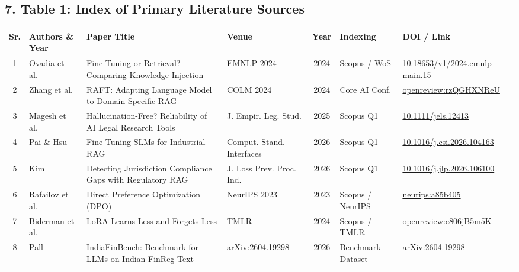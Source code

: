 \documentclass[11pt,a4paper]{article}
\begin{document}
\subsection*{7. Table 1: Index of Primary Literature Sources}

\begin{table}[h!]
\centering
\scriptsize
\begin{tabularx}{\textwidth}{|c|l|X|l|c|l|l|}
\hline
\rowcolor{tablehead} \textbf{Sr.} & \textbf{Authors \& Year} & \textbf{Paper Title} & \textbf{Venue} & \textbf{Year} & \textbf{Indexing} & \textbf{DOI / Link} \\ \hline
1 & Ovadia et al.~\cite{ovadia2024knowledge} & Fine-Tuning or Retrieval? Comparing Knowledge Injection & EMNLP 2024 & 2024 & Scopus / WoS & \href{https://doi.org/10.18653/v1/2024.emnlp-main.15}{10.18653/v1/2024.emnlp-main.15} \\ \hline
2 & Zhang et al.~\cite{zhang2024raft} & RAFT: Adapting Language Model to Domain Specific RAG & COLM 2024 & 2024 & Core AI Conf. & \href{https://openreview.net/forum?id=rzQGHXNReU}{openreview:rzQGHXNReU} \\ \hline
3 & Magesh et al.~\cite{magesh2025hallucination} & Hallucination-Free? Reliability of AI Legal Research Tools & J. Empir. Leg. Stud. & 2025 & Scopus Q1 & \href{https://doi.org/10.1111/jels.12413}{10.1111/jels.12413} \\ \hline
4 & Pai \& Hsu~\cite{pai2026finetuning} & Fine-Tuning SLMs for Industrial RAG & Comput. Stand. Interfaces & 2026 & Scopus Q1 & \href{https://doi.org/10.1016/j.csi.2026.104163}{10.1016/j.csi.2026.104163} \\ \hline
5 & Kim~\cite{kim2026jurisdiction} & Detecting Jurisdiction Compliance Gaps with Regulatory RAG & J. Loss Prev. Proc. Ind. & 2026 & Scopus Q1 & \href{https://doi.org/10.1016/j.jlp.2026.106100}{10.1016/j.jlp.2026.106100} \\ \hline
6 & Rafailov et al.~\cite{rafailov2023dpo} & Direct Preference Optimization (DPO) & NeurIPS 2023 & 2023 & Scopus / NeurIPS & \href{https://proceedings.neurips.cc/paper/2023/hash/a85b405265de2473f47cfda014f740f0-Abstract-Conference.html}{neurips:a85b405} \\ \hline
7 & Biderman et al.~\cite{biderman2024lora} & LoRA Learns Less and Forgets Less & TMLR & 2024 & Scopus / TMLR & \href{https://openreview.net/forum?id=c806jB5m5K}{openreview:c806jB5m5K} \\ \hline
8 & Pall~\cite{pall2026indiafinbench} & IndiaFinBench: Benchmark for LLMs on Indian FinReg Text & arXiv:2604.19298 & 2026 & Benchmark Dataset & \href{https://arxiv.org/abs/2604.19298}{arXiv:2604.19298} \\ \hline
\end{tabularx}
\end{table}
\end{document}
